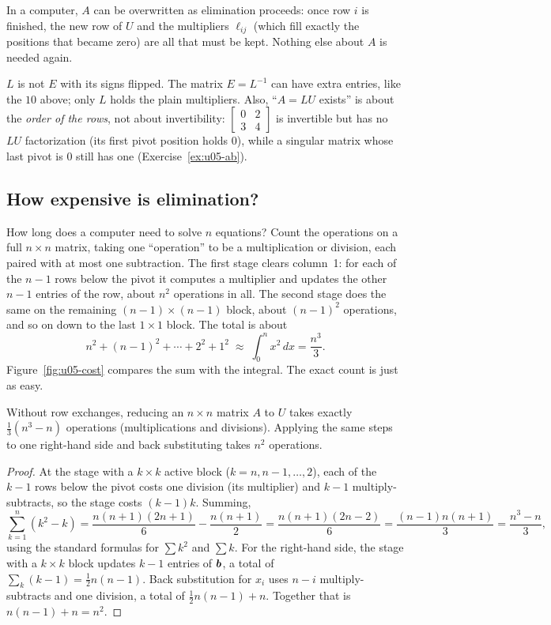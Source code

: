 In a computer, $A$ can be overwritten as elimination proceeds: once row $i$ is finished, the
new row of $U$ and the multipliers $\ell_{ij}$ (which fill exactly the positions that became
zero) are all that must be kept. Nothing else about $A$ is needed again.

\begin{trap}
$L$ is not $E$ with its signs flipped. The matrix $E=L^{-1}$ can have extra entries, like
the $10$ above; only $L$ holds the plain multipliers. Also, ``$A=LU$ exists'' is about the
\emph{order of the rows}, not about invertibility: $\begin{bmatrix} 0&2\\ 3&4\end{bmatrix}$ is
invertible but has no $LU$ factorization (its first pivot position holds $0$), while a
singular matrix whose last pivot is $0$ still has one (Exercise~\ref{ex:u05-ab}).
\end{trap}

\subsection{How expensive is elimination?}

How long does a computer need to solve $n$ equations? Count the operations on a full
$n\times n$ matrix, taking one ``operation'' to be a multiplication or division, each paired
with at most one subtraction. The first stage clears column~1: for each of the $n-1$ rows
below the pivot it computes a multiplier and updates the other $n-1$ entries of the row, about
$n^2$ operations in all. The second stage does the same on the remaining
$(n-1)\times(n-1)$ block, about $(n-1)^2$ operations, and so on down to the last $1\times1$
block. The total is about
\[
  n^2+(n-1)^2+\cdots+2^2+1^2\;\approx\;\int_0^n x^2\,dx=\frac{n^3}{3}.
\]
Figure~\ref{fig:u05-cost} compares the sum with the integral. The exact count is just as
easy.

\begin{proposition}\label{prop:u05-count}
Without row exchanges, reducing an $n\times n$ matrix $A$ to $U$ takes exactly
$\tfrac13(n^3-n)$ operations (multiplications and divisions). Applying the same steps to one
right-hand side and back substituting takes $n^2$ operations.
\end{proposition}

\begin{proof}
At the stage with a $k\times k$ active block ($k=n,n-1,\dots,2$), each of the $k-1$ rows below
the pivot costs one division (its multiplier) and $k-1$ multiply-subtracts, so the stage
costs $(k-1)k$. Summing,
\[
  \sum_{k=1}^{n}(k^2-k)=\frac{n(n+1)(2n+1)}{6}-\frac{n(n+1)}{2}
  =\frac{n(n+1)(2n-2)}{6}=\frac{(n-1)n(n+1)}{3}=\frac{n^3-n}{3},
\]
using the standard formulas for $\sum k^2$ and $\sum k$. For the right-hand side, the stage
with a $k\times k$ block updates $k-1$ entries of $\boldsymbol{b}$, a total of
$\sum_{k}(k-1)=\tfrac12n(n-1)$. Back substitution for $x_i$ uses $n-i$ multiply-subtracts and
one division, a total of $\tfrac12n(n-1)+n$. Together that is $n(n-1)+n=n^2$.
\end{proof}

